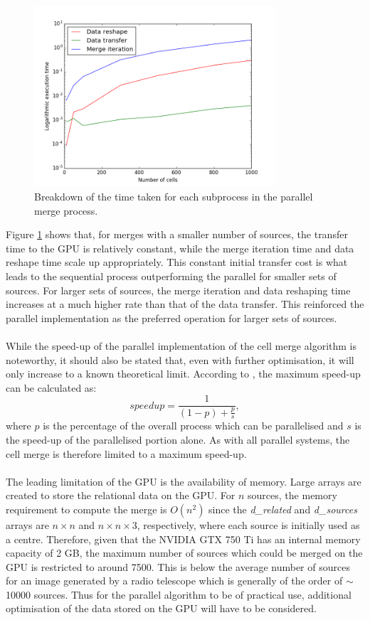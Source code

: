 \begin{figure}[H]
\centering
\includegraphics[width=0.8\textwidth]{Images/result_profile.png}
\caption{Breakdown of the time taken for each subprocess in the parallel merge process.}
\label{res:fig:prof}
\end{figure}
Figure \ref{res:fig:prof} shows that, for merges with a smaller number of sources, the transfer time to the GPU is relatively constant, while the merge iteration time and data reshape time scale up appropriately. This constant initial transfer cost is what leads to the sequential process outperforming the parallel for smaller sets of sources. For larger sets of sources, the merge iteration and data reshaping time increases at a much higher rate than that of the data transfer.  This reinforced the parallel implementation as the preferred operation for larger sets of sources.
\\
\\
While the speed-up of the parallel implementation of the cell merge algorithm is noteworthy, it should also be stated that, even with further optimisation, it will only increase to a known theoretical limit. According to \citet{amdahl1967validity}, the maximum speed-up can be calculated as:
\begin{equation}
	speedup = \frac{1}{(1-p)+\frac{p}{s}},
\end{equation}
where $p$ is the percentage of the overall process which can be parallelised and $s$ is the speed-up of the parallelised portion alone. As with all parallel systems, the cell merge is therefore limited to a maximum speed-up.
\\
\\
The leading limitation of the GPU is the availability of memory. Large arrays are created to store the relational data on the GPU. For $n$ sources, the memory requirement to compute the merge is $O(n^2)$ since the \textit{d\_related} and \textit{d\_sources} arrays are $n \times n$ and $n \times n \times 3$, respectively, where each source is initially used as a centre. Therefore, given that the NVIDIA GTX 750 Ti has an internal memory capacity of 2 GB, the maximum number of sources which could be merged on the GPU is restricted to around 7500. This is below the average number of sources for an image generated by a radio telescope which is generally of the order of $\sim$10000 sources. Thus for the parallel algorithm to be of practical use, additional optimisation of the data stored on the GPU will have to be considered.